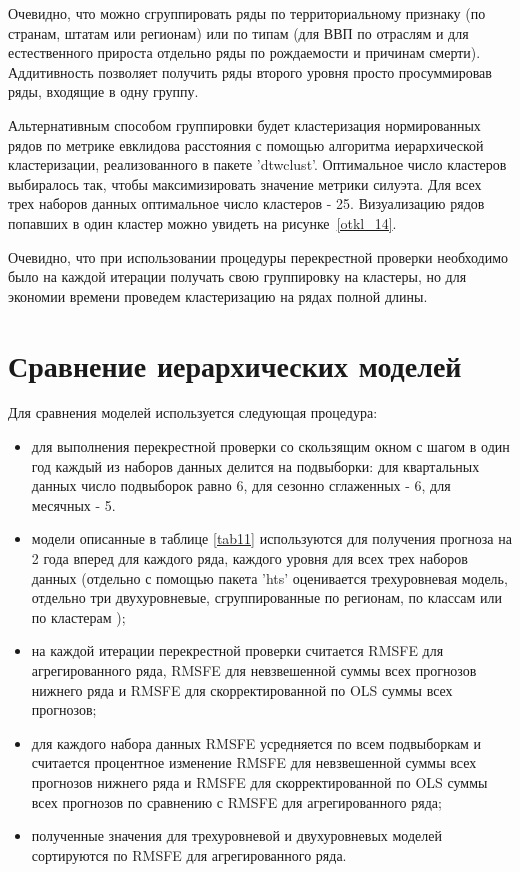 \documentclass[12pt,a4paper, oneside]{extreport}
\begin{document}
Очевидно, что можно сгруппировать ряды по территориальному признаку (по странам, штатам или регионам) или по типам (для ВВП по отраслям  и для естественного прироста  отдельно ряды по рождаемости и причинам  смерти). Аддитивность  позволяет получить ряды второго уровня просто просуммировав ряды, входящие в одну группу. 

Альтернативным способом  группировки будет кластеризация нормированных  рядов по метрике евклидова расстояния с помощью алгоритма иерархической кластеризации, реализованного в пакете 'dtwclust'.  
Оптимальное число кластеров выбиралось так, чтобы максимизировать значение метрики силуэта. Для всех трех наборов данных оптимальное число кластеров - 25. Визуализацию рядов попавших в один кластер можно увидеть на рисунке~\ref{otkl_14}.

Очевидно, что при использовании процедуры перекрестной проверки необходимо было на каждой итерации получать свою группировку на  кластеры, но для экономии времени проведем кластеризацию на рядах полной длины.






\section{Сравнение иерархических моделей}

Для сравнения моделей используется следующая процедура: 

\begin{itemize}
	\item для выполнения перекрестной проверки со скользящим окном с шагом в один год каждый из наборов данных делится на подвыборки: для квартальных данных число подвыборок равно 6, для сезонно сглаженных - 6, для месячных - 5.
	\item модели описанные в таблице \ref{tab11} используются для получения прогноза на 2 года вперед для каждого ряда, каждого уровня для всех трех наборов данных (отдельно с помощью пакета 'hts' оценивается   трехуровневая модель,  отдельно три двухуровневые, сгруппированные по регионам, по классам или по кластерам );
	\item на каждой итерации перекрестной проверки считается RMSFE для агрегированного ряда, RMSFE для невзвешенной суммы всех прогнозов нижнего ряда и RMSFE для скорректированной по OLS суммы всех прогнозов;
	\item для каждого набора данных RMSFE усредняется по  всем подвыборкам и считается процентное изменение  RMSFE для невзвешенной суммы всех прогнозов нижнего ряда и RMSFE для скорректированной по OLS суммы всех прогнозов по сравнению с RMSFE для агрегированного ряда;
	\item полученные значения для трехуровневой и двухуровневых моделей сортируются по  RMSFE   для агрегированного ряда.
\end{itemize}
\end{document}
